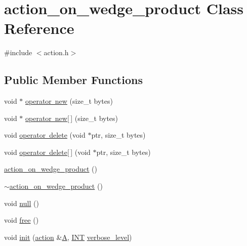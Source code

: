 \hypertarget{classaction__on__wedge__product}{}\section{action\+\_\+on\+\_\+wedge\+\_\+product Class Reference}
\label{classaction__on__wedge__product}


{\ttfamily \#include $<$action.\+h$>$}

\subsection*{Public Member Functions}
\begin{DoxyCompactItemize}
\item 
void $\ast$ \mbox{\hyperlink{classaction__on__wedge__product_a2f2c8dc41678ed741cdf12879536070a}{operator new}} (size\+\_\+t bytes)
\item 
void $\ast$ \mbox{\hyperlink{classaction__on__wedge__product_ae7180e94c60af3ccf7bd1067d5323096}{operator new\mbox{[}$\,$\mbox{]}}} (size\+\_\+t bytes)
\item 
void \mbox{\hyperlink{classaction__on__wedge__product_a644ac4e2c15e40427e37777ed61d78b9}{operator delete}} (void $\ast$ptr, size\+\_\+t bytes)
\item 
void \mbox{\hyperlink{classaction__on__wedge__product_a5ab239989bcaefb93b3c91a2e317ae50}{operator delete\mbox{[}$\,$\mbox{]}}} (void $\ast$ptr, size\+\_\+t bytes)
\item 
\mbox{\hyperlink{classaction__on__wedge__product_ae3a5080e2a44475ec8d8b600fab71d9a}{action\+\_\+on\+\_\+wedge\+\_\+product}} ()
\item 
\mbox{\hyperlink{classaction__on__wedge__product_a5a8182a912819b2de07b48b95b3a36cf}{$\sim$action\+\_\+on\+\_\+wedge\+\_\+product}} ()
\item 
void \mbox{\hyperlink{classaction__on__wedge__product_afd9d18afdf959703d7c3fa7a58868aae}{null}} ()
\item 
void \mbox{\hyperlink{classaction__on__wedge__product_a1f515c681daf5c8690df1d9cdb76e2cf}{free}} ()
\item 
void \mbox{\hyperlink{classaction__on__wedge__product_a945e921589de9125fabe2e7a8b698081}{init}} (\mbox{\hyperlink{classaction}{action}} \&\mbox{\hyperlink{simeon_8_c_a97833f04c3a9c008df5521a2fc291bb4}{A}}, \mbox{\hyperlink{galois_8h_a09fddde158a3a20bd2dcadb609de11dc}{I\+NT}} \mbox{\hyperlink{simeon_8_c_a818073fbcc2f439e7c56952f67386122}{verbose\+\_\+level}})

\end{DoxyCompactItemize}
